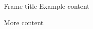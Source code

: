\begin{frame}{Frame title}
    Example content
    \begin{definition}
        More content
    \end{definition}
\end{frame}